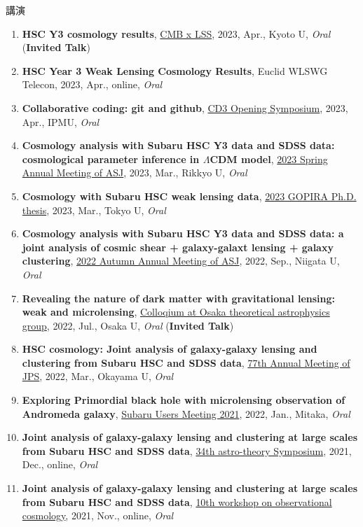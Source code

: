 \begin{rSection}{講演}
\begin{enumerate}[itemsep=0pt, parsep=0pt, topsep=0pt, partopsep=0pt]
\item \textbf{HSC Y3 cosmology results}, \href{https://www2.yukawa.kyoto-u.ac.jp/~cmb-lss/index.php}{CMB x LSS}, 2023, Apr., Kyoto U, \textit{Oral} (\textbf{Invited Talk})
\item \textbf{HSC Year 3 Weak Lensing Cosmology Results}, Euclid WLSWG Telecon, 2023, Apr., online, \textit{Oral}
\item \textbf{Collaborative coding: git and github}, \href{https://cd3.ipmu.jp/opening/}{CD3 Opening Symposium}, 2023, Apr., IPMU, \textit{Oral}
\item \textbf{Cosmology analysis with Subaru HSC Y3 data and SDSS data: cosmological parameter inference in $\Lambda$CDM model}, \href{https://www.asj.or.jp/nenkai/archive/2023a/pdf/U20a.pdf}{2023 Spring Annual Meeting of ASJ}, 2023, Mar., Rikkyo U, \textit{Oral}
\item \textbf{Cosmology with Subaru HSC weak lensing data}, \href{http://gopira.jp/Dthesis2022/program.html}{2023 GOPIRA Ph.D. thesis}, 2023, Mar., Tokyo U, \textit{Oral}
\item \textbf{Cosmology analysis with Subaru HSC Y3 data and SDSS data: a joint analysis of cosmic shear + galaxy-galaxt lensing + galaxy clustering}, \href{https://www.asj.or.jp/nenkai/archive/2022b/pdf/U15a.pdf}{2022 Autumn Annual Meeting of ASJ}, 2022, Sep., Niigata U, \textit{Oral}
\item \textbf{Revealing the nature of dark matter with gravitational lensing: weak and microlensing}, \href{http://astro-osaka.jp/OUTAP/colloquium-abstracts.html#sugiyama}{Colloqium at Osaka theoretical astrophysics group}, 2022, Jul., Osaka U, \textit{Oral} (\textbf{Invited Talk})
\item \textbf{HSC cosmology: Joint analysis of galaxy-galaxy lensing and clustering from Subaru HSC and SDSS data}, \href{https://www.jps.or.jp/activities/meetings/annual/annual-index.php}{77th Annual Meeting of JPS}, 2022, Mar., Okayama U, \textit{Oral}
\item \textbf{Exploring Primordial black hole with microlensing observation of Andromeda galaxy}, \href{https://subarutelescope.org/Science/SubaruUM/SubaruUM2021/}{Subaru Users Meeting 2021}, 2022, Jan., Mitaka, \textit{Oral}
\item \textbf{Joint analysis of galaxy-galaxy lensing and clustering at large scales from Subaru HSC and SDSS data}, \href{https://sites.google.com/view/rironkon2021/}{34th astro-theory Symposium}, 2021, Dec., online, \textit{Oral}
\item \textbf{Joint analysis of galaxy-galaxy lensing and clustering at large scales from Subaru HSC and SDSS data}, \href{https://sites.google.com/view/obscosmws2021main}{10th workshop on observational cosmology}, 2021, Nov., online, \textit{Oral}

\end{enumerate}
\end{rSection}
